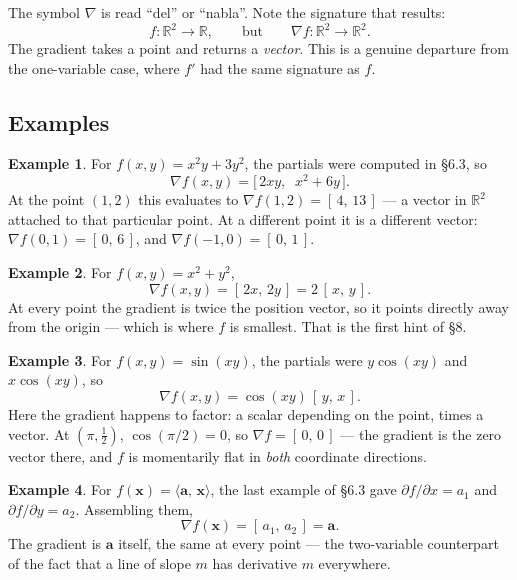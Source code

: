 \documentclass[11pt]{article}
\theoremstyle{plain}
\theoremstyle{definition}
\newtheorem{ex}{Example}[section]
\theoremstyle{remark}
\newcommand{\R}{\mathbb{R}}
\newcommand{\vc}[1]{\mathbf{#1}}
\newcommand{\ip}[2]{\langle #1,\, #2\rangle}
\newcommand{\grad}{\nabla}
\begin{document}
\noindent The symbol $\grad$ is read ``del'' or ``nabla''. Note the signature
that results:
\[
  f:\R^{2}\to\R,
  \qquad\text{but}\qquad
  \grad f:\R^{2}\to\R^{2} .
\]
The gradient takes a point and returns a \emph{vector}. This is a genuine
departure from the one-variable case, where $f'$ had the same signature as $f$.

\subsection{Examples}
\begin{ex}
For $f(x,y)=x^{2}y+3y^{2}$, the partials were computed in \S6.3, so
\[
  \grad f(x,y)=\bigl[\,2xy,\;\;x^{2}+6y\,\bigr] .
\]
At the point $(1,2)$ this evaluates to $\grad f(1,2)=[\,4,\,13\,]$ --- a vector
in $\R^{2}$ attached to that particular point. At a different point it is a
different vector: $\grad f(0,1)=[\,0,\,6\,]$, and $\grad f(-1,0)=[\,0,\,1\,]$.
\end{ex}

\begin{ex}
For $f(x,y)=x^{2}+y^{2}$,
\[
  \grad f(x,y)=[\,2x,\,2y\,]=2\,[\,x,\,y\,] .
\]
At every point the gradient is twice the position vector, so it points directly
away from the origin --- which is where $f$ is smallest. That is the first hint
of \S8.
\end{ex}

\begin{ex}
For $f(x,y)=\sin(xy)$, the partials were $y\cos(xy)$ and $x\cos(xy)$, so
\[
  \grad f(x,y) = \cos(xy)\,[\,y,\,x\,] .
\]
Here the gradient happens to factor: a scalar depending on the point, times a
vector. At $(\pi,\tfrac12)$, $\cos(\pi/2)=0$, so $\grad f=[\,0,\,0\,]$ --- the
gradient is the zero vector there, and $f$ is momentarily flat in \emph{both}
coordinate directions.
\end{ex}

\begin{ex}
For $f(\vc{x})=\ip{\vc{a}}{\vc{x}}$, the last example of \S6.3 gave
$\partial f/\partial x=a_1$ and $\partial f/\partial y=a_2$. Assembling them,
\[
  \grad f(\vc{x}) = [\,a_1,\,a_2\,] = \vc{a} .
\]
The gradient is $\vc{a}$ itself, the same at every point --- the two-variable
counterpart of the fact that a line of slope $m$ has derivative $m$ everywhere.
\end{ex}
\end{document}
